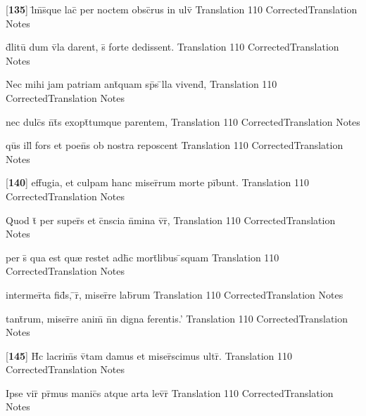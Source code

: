 \latline
  {[\textbf{135}] l\={\macron {\i}}m\={}s\={}que lac\={} per noctem obsc\={}rus in ulv\={}}
  { Translation }
  {110}
  { CorrectedTranslation }
  { Notes }


\latline
  {d\={}litu\={\macron {\i}} dum v\={}la darent, s\={\macron {\i}} forte dedissent.}
  { Translation }
  {110}
  { CorrectedTranslation }
  { Notes }


\latline
  {Nec mihi jam patriam ant\={\macron {\i}}quam sp\={}s \={}lla vivend\={\macron {\i}},}
  { Translation }
  {110}
  { CorrectedTranslation }
  { Notes }


\latline
  {nec dulc\={\macron {\i}}s n\={}t\={}s exopt\={}tumque parentem,}
  { Translation }
  {110}
  { CorrectedTranslation }
  { Notes }


\latline
  {qu\={}s ill\={\macron {\i}} fors et poen\={}s ob nostra reposcent}
  { Translation }
  {110}
  { CorrectedTranslation }
  { Notes }


\latline
  {[\textbf{140}] effugia, et culpam hanc miser\={}rum morte pi\={}bunt.}
  { Translation }
  {110}
  { CorrectedTranslation }
  { Notes }


\latline
  {Quod t\={} per super\={}s et c\={}nscia n\={}mina v\={}r\={\macron {\i}},}
  { Translation }
  {110}
  { CorrectedTranslation }
  { Notes }


\latline
  {per s\={\macron {\i}} qua est qu{\ae} restet adh\={}c mort\={}libus \={}squam}
  { Translation }
  {110}
  { CorrectedTranslation }
  { Notes }


\latline
  {intermer\={}ta fid\={}s, \={}r\={}, miser\={}re lab\={}rum}
  { Translation }
  {110}
  { CorrectedTranslation }
  { Notes }


\latline
  {tant\={}rum, miser\={}re anim\={\macron {\i}} n\={}n digna ferentis.'}
  { Translation }
  {110}
  { CorrectedTranslation }
  { Notes }


\latline
  {[\textbf{145}] H\={\macron {\i}}c lacrim\={\macron {\i}}s v\={\macron {\i}}tam damus et miser\={}scimus ultr\={}.}
  { Translation }
  {110}
  { CorrectedTranslation }
  { Notes }


\latline
  {Ipse vir\={} pr\={\macron {\i}}mus manic\={}s atque arta lev\={}r\={\macron {\i}}}
  { Translation }
  {110}
  { CorrectedTranslation }
  { Notes }


